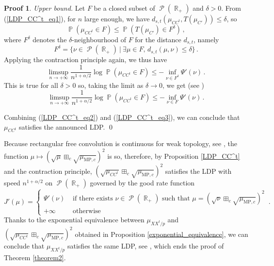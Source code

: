 \documentclass[11pt,a4paper]{article}
\DeclareMathOperator{\R}{\mathbb{R}}
\DeclareMathOperator{\PR}{\mathbb{P}}
\DeclareMathOperator{\PP}{\mathcal{P}}
\DeclareMathOperator{\1}{\mathbf{1}}
\newcommand{\mump}{\mu_{\mathrm{MP},c}}
\theoremstyle{definition}
\newtheorem*{Proof}{Proof}
\begin{document}
\begin{Proof}
\emph{Upper bound.} Let $F$ be a closed subset of $\PP(\R_+)$ and $\delta>0$. From (\ref{LDP_CC^t_eq1}), for $n$ large enough, we have $d_{s,t}(\mu_{CC^t},T(\mu_{C'})) \le \delta$, so
\begin{displaymath}
\PR(\mu_{CC^t} \in F) \le \PR(T(\mu_{C'}) \in F^{\delta}) \, ,
\end{displaymath}
where $F^{\delta}$ denotes the $\delta$-neighbourhood of $F$ for the distance $d_{s,t}$, namely
\begin{displaymath}
F^{\delta} = \{ \nu \in \PP(\R_+) \ | \ \exists \mu \in F, \, d_{s,t}(\mu,\nu) \le \delta \} \, .
\end{displaymath}
Applying the contraction principle again, we thus have
\begin{displaymath}
\limsup_{n \to +\infty} \frac{1}{n^{1+\alpha/2}} \log \PR(\mu_{CC^t} \in F) \le -\inf_{\nu \in F^{\delta}} \Psi'(\nu) \, .
\end{displaymath}
This is true for all $\delta>0$ so, taking the limit as $\delta \to 0$, we get (see \cite[Lemma 4.1.6(a)]{DZ})
\begin{equation} \label{LDP_CC^t_eq3}
\limsup_{n \to +\infty} \frac{1}{n^{1+\alpha/2}} \log \PR(\mu_{CC^t} \in F) \le -\inf_{\nu \in F} \Psi'(\nu) \, .
\end{equation}

Combining (\ref{LDP_CC^t_eq2}) and (\ref{LDP_CC^t_eq3}), we can conclude that $\mu_{CC^t}$ satisfies the announced LDP. \qed
\end{Proof}

Because rectangular free convolution is continuous for weak topology, see \cite[Theorem 3.12]{BG}, the function $\mu \mapsto \left( \sqrt{\mu} \boxplus_c \sqrt{\mump} \right)^2$ is so, therefore, by Proposition \ref{LDP_CC^t} and the contraction principle, $\left( \sqrt{\mu_{CC^t}} \boxplus_c \sqrt{\mump} \right)^2$ satisfies the LDP with speed $n^{1+\alpha/2}$ on $\PP(\R_+)$ governed by the good rate function
\begin{displaymath}
J'(\mu) = \left\{ \begin{array}{ll} \Psi'(\nu) & \textrm{ if there exists } \nu \in \PP(\R_+) \textrm{ such that } \mu = \left( \sqrt{\nu} \boxplus_c \sqrt{\mump} \right)^2 \\ +\infty & \textrm{ otherwise} \end{array} \right. \, .
\end{displaymath}
Thanks to the exponential equivalence between $\mu_{XX^t/p}$ and $\left( \sqrt{\mu_{CC^t}} \boxplus_c \sqrt{\mump} \right)^2$ obtained in Proposition \ref{exponential_equivalence}, we can conclude that $\mu_{XX^t/p}$ satisfies the same LDP, see \cite[Theorem 4.2.13]{DZ}, which ends the proof of Theorem \ref{theorem2}.
\end{document}
